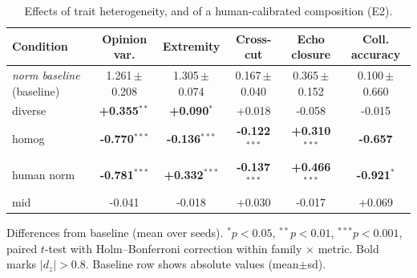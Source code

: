 \begin{table}[t]\centering
\scriptsize\setlength{\tabcolsep}{1.5pt}
\caption{Effects of trait heterogeneity, and of a human-calibrated composition (E2).}
\label{tab:e2}
\begin{tabular}{@{}lccccc@{}}
\toprule
Condition & Opinion var. & Extremity & Cross-cut & Echo closure & Coll. accuracy \\
\midrule
\textit{norm baseline} (baseline) & 1.261\,{\scriptsize$\pm$0.208} & 1.305\,{\scriptsize$\pm$0.074} & 0.167\,{\scriptsize$\pm$0.040} & 0.365\,{\scriptsize$\pm$0.152} & 0.100\,{\scriptsize$\pm$0.660} \\
\midrule
diverse & \textbf{+0.355$^{**}$} & \textbf{+0.090$^{*}$} & +0.018 & -0.058 & -0.015 \\
homog & \textbf{-0.770$^{***}$} & \textbf{-0.136$^{***}$} & \textbf{-0.122$^{***}$} & \textbf{+0.310$^{***}$} & \textbf{-0.657} \\
human norm & \textbf{-0.781$^{***}$} & \textbf{+0.332$^{***}$} & \textbf{-0.137$^{***}$} & \textbf{+0.466$^{***}$} & \textbf{-0.921$^{*}$} \\
mid & -0.041 & -0.018 & +0.030 & -0.017 & +0.069 \\
\bottomrule
\end{tabular}
\par\smallskip\footnotesize Differences from baseline (mean over seeds). $^{*}p<0.05$, $^{**}p<0.01$, $^{***}p<0.001$, paired $t$-test with Holm--Bonferroni correction within family $\times$ metric. Bold marks $|d_z|>0.8$. Baseline row shows absolute values (mean$\pm$sd).
\end{table}
